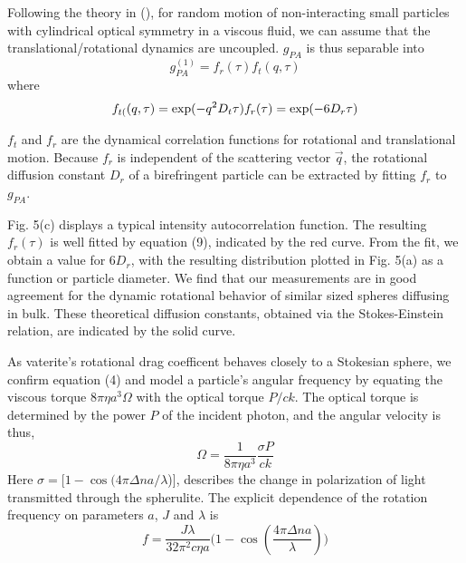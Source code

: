 \documentclass[12pt]{article}
\begin{document}
{Following the theory in (), for random motion of non-interacting small particles with cylindrical optical symmetry in a viscous fluid, we can assume that the translational/rotational
dynamics are uncoupled.  $g_{PA}$ is thus separable into 
$$
g_{PA}^{(1)}=f_{r}(\tau)f_{t}(q,\tau)
$$
 where 
\begin{equation}
f_{t(}(q,\tau)=\exp(-q^{2}D_{t}\tau)$$
$$f_{r}(\tau)=\exp(-6D_{r}\tau)
\end{equation}

$f_{t}$ and $f_{r}$ are the dynamical correlation functions for rotational and translational motion. Because $f_{r}$  is independent of the scattering vector $\vec{q}$, the rotational diffusion  constant $D_{r}$ of a birefringent particle can be extracted by fitting $f_{r}$ to  $g_{PA}$. 

Fig. 5(c) displays a typical intensity autocorrelation function. The resulting $f_{r}(\tau)$ is well fitted by equation (9), indicated by the red curve. From the fit, we obtain a value for 6$D_{r}$, with the resulting distribution plotted in Fig. 5(a) as a function or particle diameter. We find that our measurements are in good agreement for the dynamic rotational behavior of similar sized spheres diffusing in bulk. These theoretical diffusion constants, obtained via the Stokes-Einstein relation, are indicated by the solid curve.

As vaterite's rotational drag coefficent behaves closely to a Stokesian
sphere, we confirm equation (4) and model a particle's angular frequency by equating the viscous torque $8\pi\eta a^{3}\Omega$ with the optical torque $P/ck$. The optical torque is determined by the power $P$ of the incident photon, and the angular velocity is thus,
\[
\Omega=\frac{1}{8\pi\eta a^{3}}\frac{\sigma P}{ck}
\]
Here $\sigma=[1-\cos(4\pi\Delta na/\lambda$){]}, describes the change in polarization of light transmitted through the spherulite. The explicit dependence of the rotation frequency on parameters $a$, $J$ and $\lambda$ is 
\begin{equation}
f=\frac{J\lambda}{32\pi^{2}c\eta a}\bigg(1-\cos(\frac{4\pi\Delta na}{\lambda})\bigg)
\end{equation}

}
\end{document}
